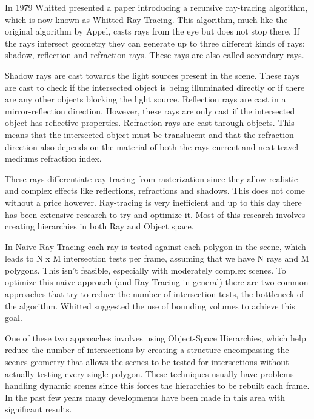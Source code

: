 \documentclass{llncs}
\begin{document}
\medskip

In 1979 Whitted \cite{Whitted80} presented a paper introducing a recursive ray-tracing algorithm, which is now known as Whitted Ray-Tracing. 
This algorithm, much like the original algorithm by Appel, casts rays from the eye but does not stop there. 
If the rays intersect geometry they can generate up to three different kinds of rays: shadow, reflection and refraction rays. These rays are also called secondary rays.

\medskip

Shadow rays are cast towards the light sources present in the scene. These rays are cast to check if the intersected object is being illuminated directly or if there are any other objects blocking the light source. 
Reflection rays are cast in a mirror-reflection direction. However, these rays are only cast if the intersected object has reflective properties. 
Refraction rays are cast through objects. This means that the intersected object must be translucent and that the refraction direction also depends on the material of both the rays current and next travel mediums refraction index.

\medskip

These rays differentiate ray-tracing from rasterization since they allow realistic and complex effects like reflections, refractions and shadows. This does not come without a price however. Ray-tracing is very inefficient and up to this day there has been extensive research to try and optimize it. Most of this research involves creating hierarchies in both Ray and Object space. 

\medskip

In Naive Ray-Tracing each ray is tested against each polygon in the scene, which leads to N x M intersection tests per frame, assuming that we have N rays and M polygons. This isn't feasible, especially with moderately complex scenes. To optimize this naive approach (and Ray-Tracing in general) there are two common approaches that try to reduce the number of intersection tests, the bottleneck of the algorithm. Whitted suggested the use of bounding volumes to achieve this goal.

\medskip

One of these two approaches involves using Object-Space Hierarchies, which help reduce the number of intersections by creating a structure encompassing the scenes geometry that allows the scenes to be tested for intersections without actually testing every single polygon. These techniques usually have problems handling dynamic scenes since this forces the hierarchies to be rebuilt each frame. In the past few years many developments have been made in this area with significant results.
\end{document}
